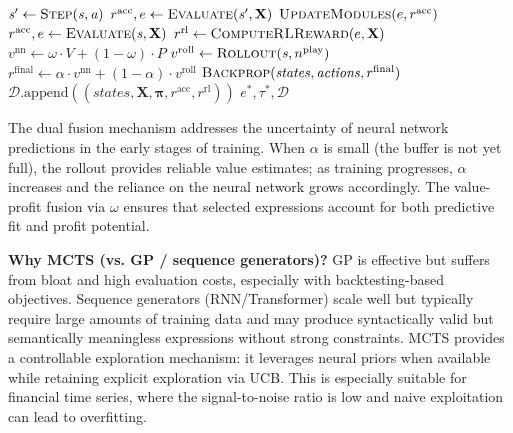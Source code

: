 \begin{algorithm}[htbp]
\begin{algorithmic}[1]
        \State $\mathit{s}' \leftarrow \textsc{Step}(\mathit{s}, \mathit{a})$
        \State $r^{\text{acc}}, e \leftarrow \textsc{Evaluate}(\mathit{s}', \mathbf{X})$ 
            \State $\textsc{UpdateModules}(e, r^{\text{acc}})$
        \EndIf
    \Else {}
        \State $r^{\text{acc}}, e \leftarrow \textsc{Evaluate}(\mathit{s}, \mathbf{X})$ 
    \EndIf
    \State $r^{\text{rl}} \leftarrow \textsc{ComputeRLReward}(e, \mathbf{X})$ 
    \State $v^{\text{nn}} \leftarrow \omega \cdot V + (1-\omega) \cdot P$ 
    \State $v^{\text{roll}} \leftarrow \textsc{Rollout}(\mathit{s}, n^{\text{play}})$ 
    \State $r^{\text{final}} \leftarrow \alpha \cdot v^{\text{nn}} + (1-\alpha) \cdot v^{\text{roll}}$ 
    \State $\textsc{Backprop}(\mathit{states}, \mathit{actions}, r^{\text{final}})$
    \State $\mathcal{D}.\text{append}((\mathit{states}, \mathbf{X}, \boldsymbol{\pi}, r^{\text{acc}}, r^{\text{rl}}))$
\EndFor
\State \Return $e^{*}, \tau^{*}, \mathcal{D}$
\end{algorithmic}
\end{algorithm}

The dual fusion mechanism addresses the uncertainty of neural network predictions in the early stages of training. When $\alpha$ is small (the buffer is not yet full), the rollout provides reliable value estimates; as training progresses, $\alpha$ increases and the reliance on the neural network grows accordingly. The value-profit fusion via $\omega$ ensures that selected expressions account for both predictive fit and profit potential.

\textbf{Why MCTS (vs. GP / sequence generators)?} GP is effective but suffers from bloat and high evaluation costs, especially with backtesting-based objectives. Sequence generators (RNN/Transformer) scale well but typically require large amounts of training data and may produce syntactically valid but semantically meaningless expressions without strong constraints. MCTS provides a controllable exploration mechanism: it leverages neural priors when available while retaining explicit exploration via UCB. This is especially suitable for financial time series, where the signal-to-noise ratio is low and naive exploitation can lead to overfitting.


